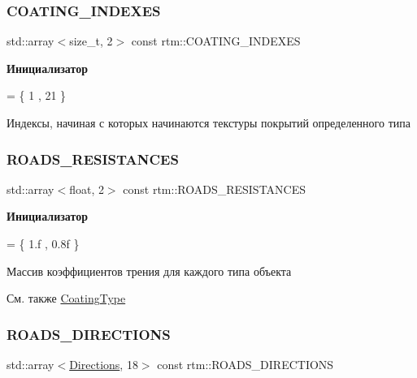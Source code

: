 \subsubsection{\texorpdfstring{C\+O\+A\+T\+I\+N\+G\+\_\+\+I\+N\+D\+E\+X\+ES}{COATING\_INDEXES}}
{\footnotesize\ttfamily std\+::array$<$size\+\_\+t, 2$>$ const rtm\+::\+C\+O\+A\+T\+I\+N\+G\+\_\+\+I\+N\+D\+E\+X\+ES}

{\bfseries Инициализатор}
\begin{DoxyCode}
= \{
        1       
        , 21    
    \}
\end{DoxyCode}


Индексы, начиная с которых начинаются текстуры покрытий определенного типа 

\mbox{\label{namespacertm_a9f4d245ca5d201a5853914c175d0d17f}} 
\subsubsection{\texorpdfstring{R\+O\+A\+D\+S\+\_\+\+R\+E\+S\+I\+S\+T\+A\+N\+C\+ES}{ROADS\_RESISTANCES}}
{\footnotesize\ttfamily std\+::array$<$float, 2$>$ const rtm\+::\+R\+O\+A\+D\+S\+\_\+\+R\+E\+S\+I\+S\+T\+A\+N\+C\+ES}

{\bfseries Инициализатор}
\begin{DoxyCode}
= \{
        1.f   
        , 0.8f   
    \}
\end{DoxyCode}


Массив коэффициентов трения для каждого типа объекта 

\begin{DoxySeeAlso}{См. также}
\hyperlink{namespacertm_aecd3929e64cd461eb3555b611f6fad95}{Coating\+Type} 
\end{DoxySeeAlso}
\mbox{\label{namespacertm_a5820286728bf347e0320bdd9dc91ed1b}} 
\subsubsection{\texorpdfstring{R\+O\+A\+D\+S\+\_\+\+D\+I\+R\+E\+C\+T\+I\+O\+NS}{ROADS\_DIRECTIONS}}
{\footnotesize\ttfamily std\+::array$<$\hyperlink{namespacertm_a4776fbfe59834ff1a16838ad6735b69a}{Directions}, 18$>$ const rtm\+::\+R\+O\+A\+D\+S\+\_\+\+D\+I\+R\+E\+C\+T\+I\+O\+NS}

